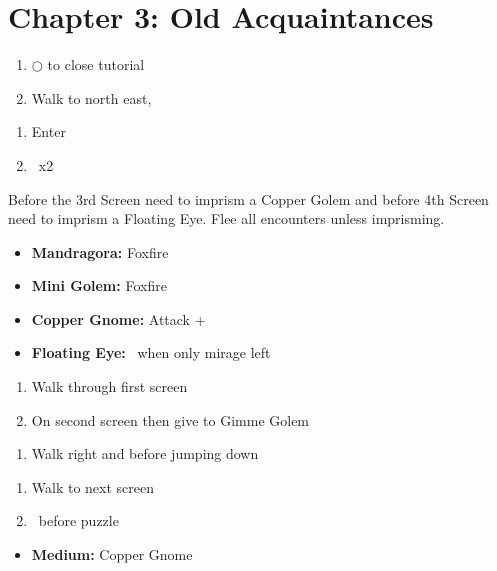 \chapter{Chapter 3: Old Acquaintances}
\begin{enumerate}
	\item $\bigcirc$ to close tutorial
	\item Walk to north east, 
\end{enumerate}
\begin{enumerate}[resume]
	\item Enter 
	\item \cs\ x2
\end{enumerate}
\begin{encounters}
Before the 3rd Screen need to imprism a Copper Golem and before 4th Screen need to imprism a Floating Eye. Flee all encounters unless imprisming.
	\begin{itemize}
		\item \textbf{Mandragora:} Foxfire
		\item \textbf{Mini Golem:} Foxfire
		\item \textbf{Copper Gnome:} Attack + \imprism\
		\item \textbf{Floating Eye:} \imprism\ when only mirage left
	\end{itemize}
\end{encounters}
\begin{enumerate}[resume]
	\item Walk through first screen
	\item On second screen  then give to Gimme Golem
\end{enumerate}
\begin{enumerate}[resume]
	\item Walk right and before jumping down 
\end{enumerate}
\begin{enumerate}[resume]
	\item Walk to next screen
	\item \cs\ before puzzle
\end{enumerate}
\begin{puzzle}
	\begin{itemize}
		\item \textbf{Medium:} Copper Gnome
	\end{itemize}
\end{puzzle}
